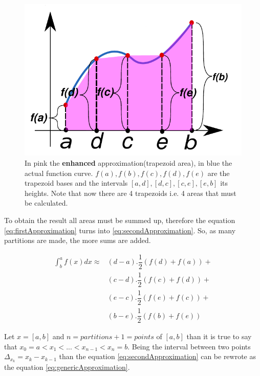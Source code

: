 	\begin{figure}[h]
		\centering
		\includegraphics[width=0.7\linewidth]{images/Trapezoidal_rule_illustration2}
		\caption[Enhanced approximation of an integral]{In pink the \textbf{enhanced} approximation(trapezoid area), in blue the actual function curve. $f(a), f(b), f(c), f(d), f(e)$ are the trapezoid bases and the intervals $[a, d],[d,c], [c,e], [e,b]$ its heights. Note that now there are 4 trapezoids i.e. 4 areas that must be calculated. }
		\label{fig:trapezoidalruleillustration2}
	\end{figure}

	\par To obtain the result all areas must be summed up, therefore the equation \ref{eq:firstApproximation} turns into \ref{eq:secondApproximation}. So, as many partitions are made, the more sums are added.\newline
	
	\begin{equation}
		\begin{aligned}
			\int^a_b{f(x) dx} \approx 
			&(d-a).\dfrac{1}{2}(f(d)+f(a))+\\
			&(c-d).\dfrac{1}{2}(f(c)+f(d))+\\
			&(e-c).\dfrac{1}{2}(f(e)+f(c))+\\
			&(b-e).\dfrac{1}{2}(f(b)+f(e))
		\end{aligned}
		\label{eq:secondApproximation}
	\end{equation}

	\par Let $x = [a,b]$ and $n=partitions+1=points$ of $[a,b]$ than it is true to say that $x_0 = a < x_1 < ... < x_{n-1} < x_n = b$. Being the interval between two points $\Delta_{x_k} = x_k - x_{k-1}$ than the equation \ref*{eq:secondApproximation} can be rewrote as the equation \ref{eq:genericApproximation}.\newline
	
